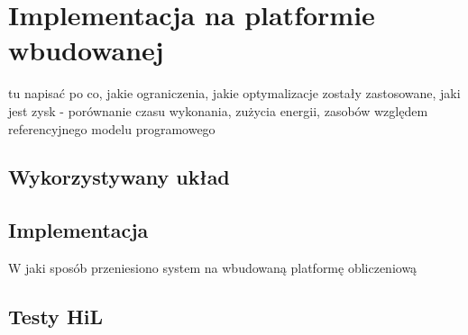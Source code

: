 \chapter{Implementacja na platformie wbudowanej}
\label{cha:implementacja}

tu napisać po co, jakie ograniczenia, jakie optymalizacje zostały zastosowane, jaki jest zysk - porównanie czasu wykonania, zużycia energii, zasobów względem referencyjnego modelu programowego

\section{Wykorzystywany układ}
\label{sec:plytka}



\section{Implementacja}
\label{sec:implementacja}

W jaki sposób przeniesiono system na wbudowaną platformę obliczeniową

\section{Testy HiL}
\label{sec:testy}
